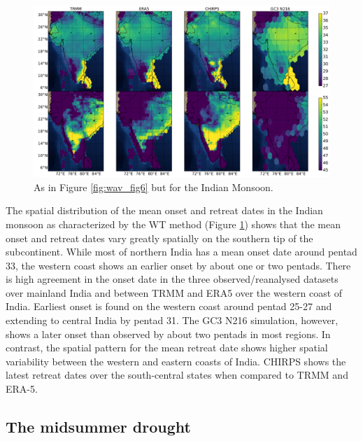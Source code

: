 \begin{figure}
\centering
 \includegraphics[width=\linewidth]{figures/wav_fig9.pdf}
\caption[Onset and retreat dates spatial distribution in Indian monsoon]{ As in Figure \ref{fig:wav_fig6} but for the Indian Monsoon.  }
\label{fig:wav_fig9}
\end{figure}

The spatial distribution of the mean onset and retreat dates in the Indian monsoon as characterized by the WT method (Figure \ref{fig:wav_fig9}) shows that the mean onset and retreat dates vary greatly spatially on the southern tip of the subcontinent. While most of northern India has a mean onset date around pentad 33, the western coast shows an earlier onset by about one or two pentads. There is high agreement in the onset date in the three observed/reanalysed datasets over mainland India and between TRMM and ERA5 over the western coast of India. Earliest onset is found on the western coast around pentad 25-27 and extending to central India by pentad 31. 
The GC3 N216 simulation, however, shows a later onset than observed by about two pentads in most regions. In contrast, the spatial pattern for the mean retreat date shows higher spatial variability between the western and eastern coasts of India. CHIRPS shows the latest retreat dates over the south-central states when compared to TRMM and ERA-5. 

\subsection{The midsummer drought}


